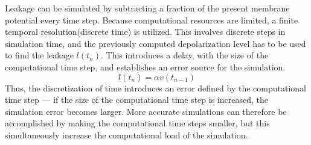 	Leakage can be simulated by subtracting a fraction of the present membrane potential every time step.
	Because computational resources are limited, a finite temporal resolution(discrete time) is utilized.
	This involves discrete steps in simulation time, and the previously computed depolarization level has to be used to find the leakage $l(t_n)$.
	This introduces a delay, with the size of the computational time step, and establishes an error source for the simulation.
\begin{equation}
	l(t_n) = \alpha v(t_{n-1})
\end{equation}
	Thus, the discretization of time introduces an error defined by the computational time step ---
		if the size of the computational time step is increased, the simulation error becomes larger.
	More accurate simulations can therefore be accomplished by making the computational time steps smaller, but this simultaneously increase the computational load of the simulation.
	





